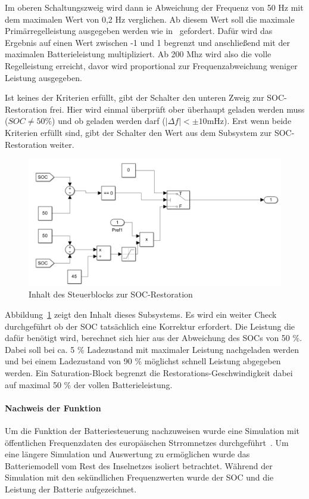 Im oberen Schaltungszweig wird dann ie Abweichung der Frequenz von 50 Hz mit dem maximalen Wert von 0,2 Hz verglichen.
Ab diesem Wert soll die maximale Primärregelleistung ausgegeben werden wie in~\parencite[Kap. 3.1]{Regelleistung} gefordert.
Dafür wird das Ergebnis auf einen Wert zwischen -1 und 1 begrenzt und anschließend 
mit der maximalen Batterieleistung multipliziert.
Ab 200 Mhz wird also die volle Regelleistung erreicht, davor wird proportional zur Frequenzabweichung
weniger Leistung ausgegeben.

Ist keines der Kriterien erfüllt, gibt der Schalter den unteren Zweig zur SOC-Restoration frei.
Hier wird einmal überprüft ober überhaupt geladen werden muss ($SOC \neq 50 \%$) und ob geladen werden darf ($|\Delta f| < \pm 10 \text{mHz}$).
Erst wenn beide Kriterien erfüllt sind, gibt der Schalter den Wert aus dem Subsystem zur SOC-Restoration weiter.

\begin{figure}[h!]
	\centering
	\includegraphics[width=12cm]{Abbildungen/SOC-Rest.png}
	\caption{Inhalt des Steuerblocks zur SOC-Restoration}\label{SOC-Rest}
\end{figure}

Abbildung~\ref{SOC-Rest} zeigt den Inhalt dieses Subsystems.
Es wird ein weiter Check durchgeführt ob der SOC tatsächlich eine Korrektur erfordert.
Die Leistung die dafür benötigt wird, berechnet sich hier aus der Abweichung des SOCs von 50 \%.
Dabei soll bei ca. 5 \% Ladezustand mit maximaler Leistung nachgeladen werden und bei einem Ladezustand von
90 \% möglichst schnell Leistung abgegeben werden.
Ein Saturation-Block begrenzt die Restorations-Geschwindigkeit dabei auf maximal 50 \% der vollen Batterieleistung.

\paragraph{Nachweis der Funktion}
Um die Funktion der Batteriesteuerung nachzuweisen wurde eine Simulation mit öffentlichen Frequenzdaten des europäischen Strromnetzes durchgeführt~\parencite[]{noauthor_netztransparenz_nodate}.
Um eine längere Simulation und Auswertung zu ermöglichen wurde das Batteriemodell vom Rest des Inselnetzes isoliert betrachtet.
Während der Simulation mit den sekündlichen Frequenzwerten wurde der SOC und die Leistung der Batterie aufgezeichnet.

